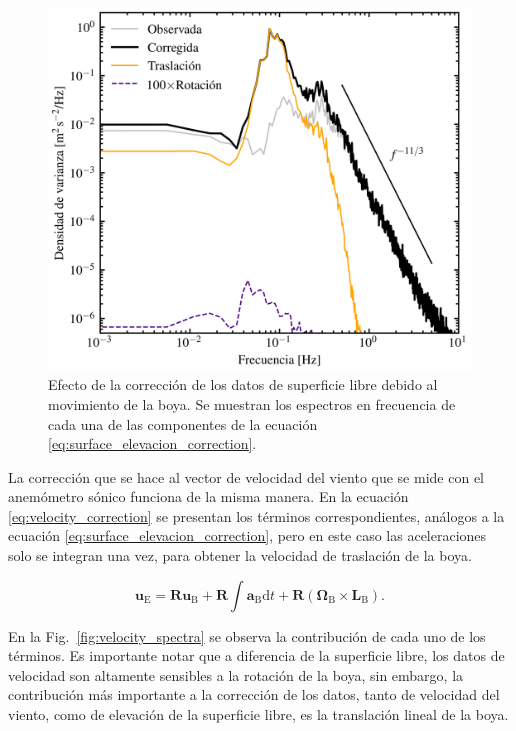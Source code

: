 \documentclass[11pt]{article}
\begin{document}
\begin{figure}[htpb]
  \centering
  \includegraphics[width=0.7\linewidth]{./figures/surface_elevation_spectra.png}
  \caption{
    Efecto de la corrección de los datos de superficie libre debido al movimiento
    de la boya. Se muestran los espectros en frecuencia de cada una de las
    componentes de la ecuación \eqref{eq:surface_elevacion_correction}.
  }
  \label{fig:surface_elevation_spectra}
\end{figure}

La corrección que se hace al vector de velocidad del viento que se mide con el
anemómetro sónico funciona de la misma manera. En la ecuación
\eqref{eq:velocity_correction} se presentan los términos correspondientes,
análogos a la ecuación \eqref{eq:surface_elevacion_correction}, pero en este
caso las aceleraciones solo se integran una vez, para obtener la velocidad de
traslación de la boya.

\begin{equation}
  \mathbf{u}_\mathrm{E} =
    \mathbf{R} \mathbf{u}_\mathrm{B} + 
    \mathbf{R} \displaystyle\int
      \mathbf{a}_\mathrm{B} \mathrm{d}t +
      \mathbf{R} \left( \boldsymbol{\Omega}_\mathrm{B} \times
      \mathbf{L}_\mathrm{B} \right).
\label{eq:velocity_correction}
\end{equation}

En la Fig.~\ref{fig:velocity_spectra} se observa la contribución de cada uno de
los términos. Es importante notar que a diferencia de la superficie libre, los
datos de velocidad son altamente sensibles a la rotación de la boya, sin
embargo, la contribución más importante a la corrección de los datos, tanto de
velocidad del viento, como de elevación de la superficie libre, es la
translación lineal de la boya. 
\end{document}
